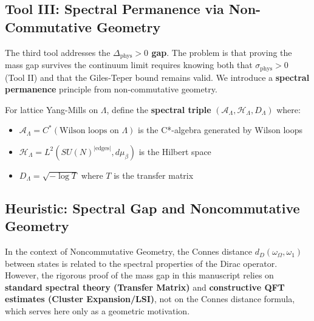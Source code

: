 \subsection{Tool III: Spectral Permanence via Non-Commutative Geometry}
\label{subsec:tool-spectral}

The third tool addresses the \textbf{$\Delta_{\text{phys}} > 0$ gap}. The 
problem is that proving the mass gap survives the continuum limit requires 
knowing both that $\sigma_{\text{phys}} > 0$ (Tool II) and that the 
Giles-Teper bound remains valid. We introduce a \textbf{spectral permanence} 
principle from non-commutative geometry.

\begin{definition}
\label{def:spectral-triple-v2}
For lattice Yang-Mills on $\Lambda$, define the \textbf{spectral triple} 
$(\mathcal{A}_\Lambda, \mathcal{H}_\Lambda, D_\Lambda)$ where:
\begin{itemize}
\item $\mathcal{A}_\Lambda = C^*(\text{Wilson loops on } \Lambda)$ is the 
C*-algebra generated by Wilson loops
\item $\mathcal{H}_\Lambda = L^2(SU(N)^{|\text{edges}|}, d\mu_\beta)$ is the 
Hilbert space
\item $D_\Lambda = \sqrt{-\log T}$ where $T$ is the transfer matrix
\end{itemize}
\end{definition}

\subsection{Heuristic: Spectral Gap and Noncommutative Geometry}

\begin{remark}
\label{rem:connes-gap-heuristic}
In the context of Noncommutative Geometry, the Connes distance $d_D(\omega_\Omega, \omega_1)$ between states is related to the spectral properties of the Dirac operator.
However, the rigorous proof of the mass gap in this manuscript relies on \textbf{standard spectral theory (Transfer Matrix)} and \textbf{constructive QFT estimates (Cluster Expansion/LSI)}, not on the Connes distance formula, which serves here only as a geometric motivation.
\end{remark}


